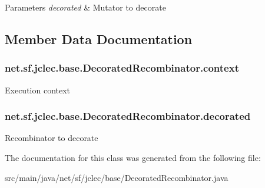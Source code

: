 \begin{DoxyParams}{Parameters}
{\em decorated} & Mutator to decorate \\
\hline
\end{DoxyParams}


\subsection{Member Data Documentation}
\hypertarget{classnet_1_1sf_1_1jclec_1_1base_1_1_decorated_recombinator_a9fec99558ae7ddcf3ce82d8293305786}{
\subsubsection[{context}]{ net.\-sf.\-jclec.\-base.\-Decorated\-Recombinator.\-context\hspace{0.3cm}{\ttfamily [protected]}}}\label{classnet_1_1sf_1_1jclec_1_1base_1_1_decorated_recombinator_a9fec99558ae7ddcf3ce82d8293305786}
Execution context \hypertarget{classnet_1_1sf_1_1jclec_1_1base_1_1_decorated_recombinator_a525eba528ff918e1be5d29d74cefb614}{
\subsubsection[{decorated}]{ net.\-sf.\-jclec.\-base.\-Decorated\-Recombinator.\-decorated\hspace{0.3cm}{\ttfamily [protected]}}}\label{classnet_1_1sf_1_1jclec_1_1base_1_1_decorated_recombinator_a525eba528ff918e1be5d29d74cefb614}
Recombinator to decorate 

The documentation for this class was generated from the following file\-:\begin{DoxyCompactItemize}
\item 
src/main/java/net/sf/jclec/base/Decorated\-Recombinator.\-java\end{DoxyCompactItemize}

